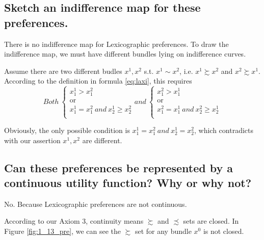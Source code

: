 \documentclass{article}
\begin{document}
\subsection{Sketch an indifference map for these preferences.}
There is no indifference map for Lexicographic preferences. To draw the indifference map,
we must have different bundles lying on indifference curves.

Assume there are two different budles $x^1, x^2$ s.t. $x^1 \sim x^2$, i.e. $x^1 \succsim x^2$
and $x^2 \succsim x^1$. According to the definition in formula \ref{eq:laxi}, this requires
\begin{equation}
    Both \
    \begin{cases}
      \text{$x^1_1 > x^2_1$}\\
      \text{or}\\
      \text{$x^1_1 = x^2_1 \ and \ x^1_2 \ge x^2_2$}\\
    \end{cases}
    and \ 
    \begin{cases}
      \text{$x^2_1 > x^1_1$}\\
      \text{or}\\
      \text{$x^2_1 = x^1_1 \ and \ x^2_2 \ge x^1_2$}\\
    \end{cases}
    \label{eq:nomap}   
\end{equation}

Obviously, the only possible condition is $x^1_1 = x^2_1 \ and \ x^1_2 = x^2_2$, which contradicts
with our assertion $x^1, x^2$ are different.

\subsection{Can these preferences be represented by a continuous utility function? Why or why not?}

No. Because Lexicographic preferences are not continuous. 

According to our Axiom 3, continuity means $\succsim$ and $\precsim$ sets are closed. 
In Figure \ref{fig:1_13_pre}, we can see the $\succsim$ set for any bundle $x^0$ is not closed.

{\centering
{}
\label{fig:1_13_pre}}
\end{document}
